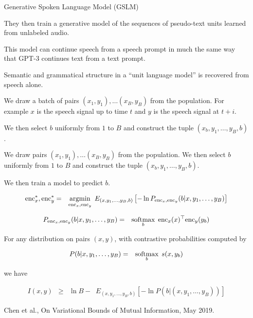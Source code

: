 {Generative Spoken Language Model (GSLM)

\vfill
They then train a generative model of the sequences of pseudo-text units learned from unlabeled audio.


\vfill
This model can continue speech from a speech prompt in much the same way that GPT-3 continues text from a text prompt.

\vfill
Semantic and grammatical structure in a ``unit language model'' is recovered
from speech alone.



We draw a batch of pairs $(x_1,y_1), \ldots (x_B,y_B)$ from the population.
For example $x$ is the speech signal up to time $t$ and $y$ is the speech signal
at $t+i$.

\vfill
We then select $b$ uniformly from $1$ to $B$ and construct the tuple $(x_b,y_1,\ldots,y_B,b)$.


We draw pairs $(x_1,y_1), \ldots (x_B,y_B)$ from the population.
We then select $b$ uniformly from $1$ to $B$ and construct the tuple $(x_b,y_1,\ldots,y_B,b)$.

\vfill
We then train a model to predict $b$.
\vfill
{\huge
\begin{eqnarray*}
\mathrm{enc}_x^*,\mathrm{enc}_y^* & = & \operatorname*{argmin}_{\mathrm{enc}_x,\mathrm{enc}_y} \;E_{(x,y_1,\ldots,y_B,b)}\left[-\ln P_{\mathrm{enc}_x,\mathrm{enc}_y}(b|x,y_1,\ldots,y_B)\right]
\end{eqnarray*}

\begin{eqnarray*}
P_{\mathrm{enc}_x,\mathrm{enc}_y}(b|x,y_1,\ldots,y_B) & = & \operatorname*{softmax}_b\; \mathrm{enc}_x(x)^\top\mathrm{enc}_y(y_b)
\end{eqnarray*}
}


For any distribution on pairs $(x,y)$, with contrastive probabilities computed by

\begin{eqnarray*}
P(b|x,y_1,\ldots,y_B) & = & \operatorname*{softmax}_b\;s(x,y_b)
\end{eqnarray*}

we have

{\huge
\begin{eqnarray*}
I(x,y) & \geq & \ln B - \;\;E_{(x,y_1,\ldots,y_B,b)}\left[-\ln P(b|(x,y_1,\ldots,y_B))\right]
\end{eqnarray*}
}

Chen et al., On Variational Bounds of Mutual Information, May 2019.

}
